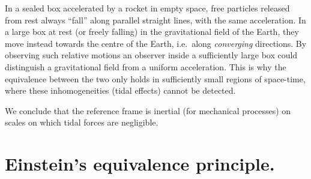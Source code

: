 \begin{points}
\begin{carroll}
In a sealed box accelerated by a rocket in empty space, free particles released from rest always ``fall'' along parallel straight lines, with the same acceleration. In a large box at rest (or freely falling) in the gravitational field of the Earth, they move instead towards the centre of the Earth, i.e.\ along \emph{converging} directions. By observing such relative motions an observer inside a sufficiently large box could distinguish a gravitational field from a uniform acceleration. This is why the equivalence between the two only holds in sufficiently small regions of space-time, where these inhomogeneities (tidal effects) cannot be detected.
\begin{center}
\end{center}
\end{carroll}

\item We conclude that the reference frame is inertial (for mechanical processes) on scales on which tidal forces are negligible.
\end{points}

\section{Einstein's equivalence principle.}


